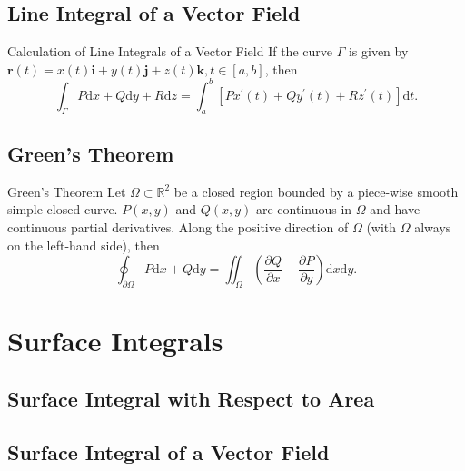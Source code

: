 \subsection{Line Integral of a Vector Field}

\begin{proposition}{Calculation of Line Integrals of a Vector Field}{}
  If the curve $\Gamma$ is given by $\mathbf{r}(t) = x(t)\mathbf{i} +
  y(t)\mathbf{j} + z(t)\mathbf{k}, t \in [a, b]$,
  then
  \begin{equation}
    \int_{\Gamma}P \mathrm{d} x + Q\mathrm{d} y + R\mathrm{d} z
    = \int_a^b \left[ Px^{\prime}(t) + Qy^{\prime}(t) + Rz^{\prime}(t) \right]\mathrm{d} t.
  \end{equation}
\end{proposition}

\subsection{Green's Theorem}

\begin{theorem}{Green's Theorem}{}
  Let $\Omega \subset \mathbb{R}^2$ be a closed region bounded by a piece-wise
  smooth simple closed curve.
  $P(x,y)$ and $Q(x,y)$ are continuous in $\Omega$ and have continuous partial derivatives.
  Along the positive direction of $\Omega$ (with $\Omega$ always on the
  left-hand side), then
  \begin{equation}
    \oint_{\partial \Omega} P \mathrm{d} x + Q \mathrm{d} y
    = \iint_{\Omega} \left( \frac{\partial Q}{\partial x} - \frac{\partial P}{\partial y} \right) \mathrm{d} x \mathrm{d}y.
  \end{equation}
\end{theorem}






\section{Surface Integrals}

\subsection{Surface Integral with Respect to Area}

\subsection{Surface Integral of a Vector Field}



